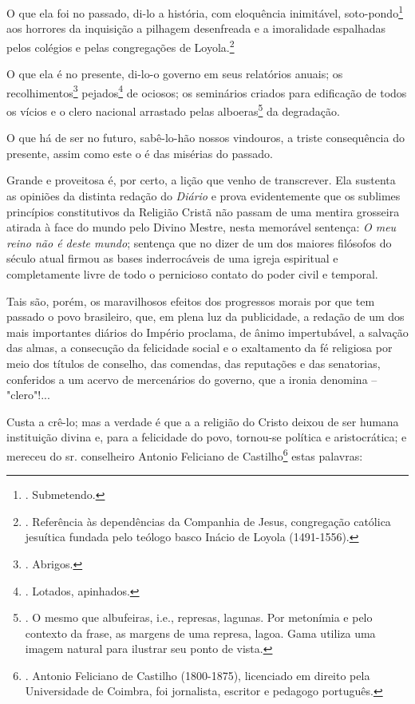 O que ela foi no passado, di-lo a história, com eloquência inimitável,
soto-pondo\footnote{. Submetendo.} aos horrores da inquisição a pilhagem
desenfreada e a imoralidade espalhadas pelos colégios e pelas
congregações de Loyola.\footnote{. Referência às dependências da
  Companhia de Jesus, congregação católica jesuítica fundada pelo
  teólogo basco Inácio de Loyola (1491-1556).}

O que ela é no presente, di-lo-o governo em seus relatórios anuais; os
recolhimentos\footnote{. Abrigos.} pejados\footnote{. Lotados,
  apinhados.} de ociosos; os seminários criados para edificação de todos
os vícios e o clero nacional arrastado pelas alboeras\footnote{. O mesmo
  que albufeiras, i.e., represas, lagunas. Por metonímia e pelo contexto
  da frase, as margens de uma represa, lagoa. Gama utiliza uma imagem
  natural para ilustrar seu ponto de vista.} da degradação.

O que há de ser no futuro, sabê-lo-hão nossos vindouros, a triste
consequência do presente, assim como este o é das misérias do passado.

Grande e proveitosa é, por certo, a lição que venho de transcrever. Ela
sustenta as opiniões da distinta redação do \emph{Diário} e prova
evidentemente que os sublimes princípios constitutivos da Religião
Cristã não passam de uma mentira grosseira atirada à face do mundo pelo
Divino Mestre, nesta memorável sentença: \emph{O meu reino não é deste
mundo}; sentença que no dizer de um dos maiores filósofos do século
atual firmou as bases inderrocáveis de uma igreja espiritual e
completamente livre de todo o pernicioso contato do poder civil e
temporal.

Tais são, porém, os maravilhosos efeitos dos progressos morais por que
tem passado o povo brasileiro, que, em plena luz da publicidade, a
redação de um dos mais importantes diários do Império proclama, de ânimo
impertubável, a salvação das almas, a consecução da felicidade social e
o exaltamento da fé religiosa por meio dos títulos de conselho, das
comendas, das reputações e das senatorias, conferidos a um acervo de
mercenários do governo, que a ironia denomina -- "clero"!...

Custa a crê-lo; mas a verdade é que a a religião do Cristo deixou de ser
humana instituição divina e, para a felicidade do povo, tornou-se
política e aristocrática; e mereceu do sr. conselheiro Antonio Feliciano
de Castilho\footnote{. Antonio Feliciano de Castilho (1800-1875),
  licenciado em direito pela Universidade de Coimbra, foi jornalista,
  escritor e pedagogo português.} estas palavras:


